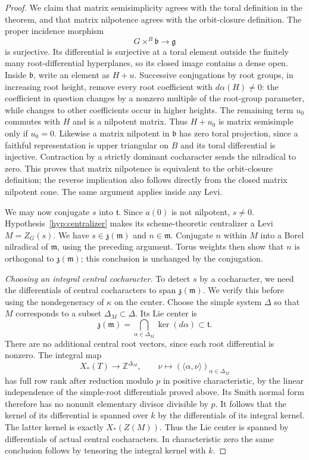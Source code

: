 \begin{proof}
We claim that matrix semisimplicity agrees with the toral definition
in the theorem, and that matrix nilpotence agrees with the orbit-closure
definition.  The proper incidence morphism
\[
             G\mathbin{\times}^{B}\mathfrak b\longrightarrow\mathfrak g
\]
is surjective.  Its differential is surjective at a toral element
outside the finitely many root-differential hyperplanes, so its closed
image contains a dense open.  Inside $\mathfrak b$, write an element
as $H+u$.  Successive conjugations by root groups, in increasing root
height, remove every root coefficient with $d\alpha(H)\ne0$:
the coefficient in question changes by a nonzero multiple of the
root-group parameter, while changes to other coefficients occur in
higher heights.  The remaining term $u_0$ commutes with $H$ and is a
nilpotent matrix.  Thus $H+u_0$ is matrix semisimple only if $u_0=0$.
Likewise a matrix nilpotent in $\mathfrak b$ has zero toral projection,
since a faithful representation is upper triangular on $B$ and its
toral differential is injective.  Contraction by a strictly dominant
cocharacter sends the nilradical to zero.  This proves that matrix
nilpotence is equivalent to the orbit-closure definition; the reverse
implication also follows directly from the closed matrix nilpotent
cone.  The same argument applies inside any Levi.

We may now conjugate $s$ into $\mathfrak t$.  Since $a(0)$ is not
nilpotent, $s\ne0$.  Hypothesis~\ref{hyp:centralizer} makes its scheme-theoretic
centralizer a Levi $M=Z_G(s)$.  We have
$s\in\mathfrak z(\mathfrak m)$ and $n\in\mathfrak m$.
Conjugate $n$ within $M$ into a Borel nilradical of $\mathfrak m$,
using the preceding argument.  Torus weights then show that $n$ is
orthogonal to $\mathfrak z(\mathfrak m)$; this conclusion is unchanged
by the conjugation.

\emph{Choosing an integral central cocharacter.}
To detect $s$ by a cocharacter, we need the differentials of central
cocharacters to span $\mathfrak z(\mathfrak m)$.  We verify this before
using the nondegeneracy of $\kappa$ on the center.
Choose the simple system $\Delta$ so that $M$ corresponds to a subset
$\Delta_M\subset\Delta$.
Its Lie center is
\[
 \mathfrak z(\mathfrak m)
       =\bigcap_{\alpha\in\Delta_M}\ker(d\alpha)\subset\mathfrak t.
\]
There are no additional central root vectors, since each root
differential is nonzero.  The integral map
\[
 X_*(T)\longrightarrow\mathbb Z^{\Delta_M},
 \qquad \nu\longmapsto
                 (\langle\alpha,\nu\rangle)_{\alpha\in\Delta_M}
\]
has full row rank after reduction modulo $p$ in positive characteristic,
by the linear independence of the simple-root differentials proved above.
Its Smith normal form therefore has no nonunit elementary divisor
divisible by $p$.
It follows that the kernel of its differential is spanned over $k$
by the differentials of its integral kernel.  The latter kernel is
exactly $X_*(Z(M))$.  Thus the Lie center is spanned by differentials
of actual central cocharacters.  In characteristic zero the same
conclusion follows by tensoring the integral kernel with $k$.


\end{proof}
